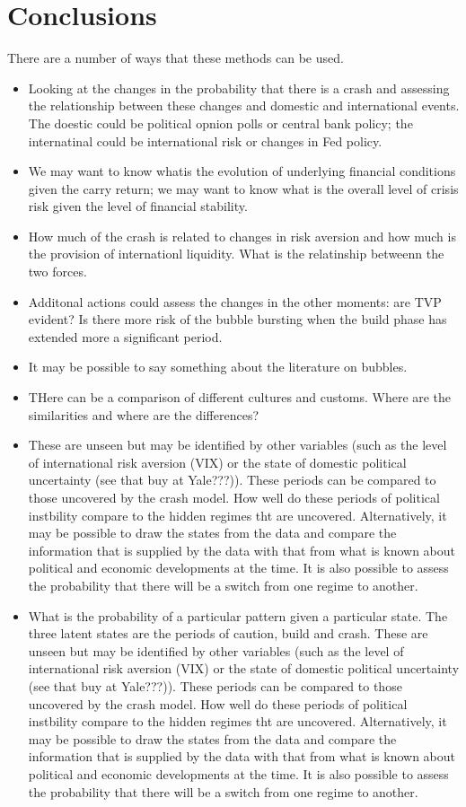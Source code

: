 \documentclass[12pt, a4paper, oneside]{article} %
\begin{document}
\section{Conclusions}
There are a number of ways that these methods can be used. 
\begin{itemize}
\item Looking at the changes in the probability that there is a crash and assessing the relationship between these changes and domestic and international events.  The doestic could be political opnion polls or central bank policy; the internatinal could be international risk or changes in Fed policy.  
\item We may want to know whatis the evolution of underlying financial conditions given the carry return; we may want to know what is the overall level of crisis risk given the level of financial stability.  
\item How much of the crash is related to changes in risk aversion and how much is the provision of internationl liquidity.  What is the relatinship betweenn the two forces. 
\item Additonal actions could assess the changes in the other moments:  are TVP evident?  Is there more risk of the bubble bursting when the build phase has extended more a significant period. 
\item It may be possible to say something about the literature on bubbles. 
\item THere can be a comparison of different cultures and customs. Where are the similarities and where are the differences?  
\item These are unseen but may be identified by other variables (such as the level of international risk aversion (VIX) or the state of domestic political uncertainty (see that buy at Yale???)).  These periods can be compared to those uncovered by the crash model.  How well do these periods of political instbility compare to the hidden regimes tht are uncovered.  Alternatively, it may be possible to draw the states from the data and compare the information that is supplied by the data with that from what is known about political and economic developments at the time.  It is also possible to assess the probability that there will be a switch from one regime to another.
\item What is the probability of a particular pattern given a particular state. The three latent states are the periods of caution, build and crash.  These are unseen but may be identified by other variables (such as the level of international risk aversion (VIX) or the state of domestic political uncertainty (see that buy at Yale???)).  These periods can be compared to those uncovered by the crash model.  How well do these periods of political instbility compare to the hidden regimes tht are uncovered.  Alternatively, it may be possible to draw the states from the data and compare the information that is supplied by the data with that from what is known about political and economic developments at the time.  It is also possible to assess the probability that there will be a switch from one regime to another. 

\end{itemize}
\end{document}
